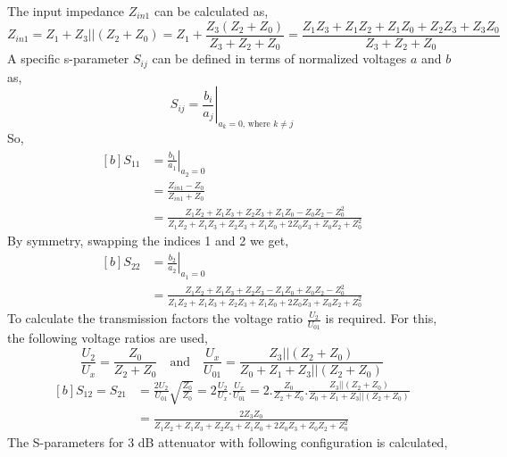 \documentclass{lab_sheet}
\newcommand\ddfrac[2]{{\displaystyle\frac{\displaystyle #1}{\displaystyle #2}}}
\begin{document}
The input impedance $Z_{in1}$ can be calculated as,
\begin{equation*}
        Z_{in1}=Z_1+Z_3||(Z_2+Z_0)=Z_1+\frac{Z_3(Z_2+Z_0)}{Z_3+Z_2+Z_0}=\frac{Z_1Z_3+Z_1Z_2+Z_1Z_0+Z_2Z_3+Z_3Z_0}{Z_3+Z_2+Z_0}
\end{equation*}
A specific s-parameter $S_{ij}$ can be defined in terms of normalized voltages $a$ and $b$ as,
\begin{equation*}
 S_{ij}= \left.\frac{b_i}{a_j}\right\vert_{a_k=0\text{, where } k\neq j}
\end{equation*}
So,
\begin{equation}
      \begin{aligned}[b]
        S_{11}&=\left.\frac{b_1}{a_1}\right\vert_{a_2=0}\\
        &=\frac{Z_{in1} - Z_0}{Z_{in1} + Z_0}\\
        &=\frac{Z_1Z_2+Z_1Z_3+Z_2Z_3+Z_1Z_0-Z_0Z_2-Z_0^2}{Z_1Z_2+Z_1Z_3+Z_2Z_3+Z_1Z_0+2Z_0Z_3+Z_0Z_2+Z_0^2}
      \end{aligned}
\end{equation}
\label{eqn:s11}
By symmetry, swapping the indices 1 and 2 we get,
\begin{equation}
    \begin{aligned}[b]
      S_{22}&=\left.\frac{b_2}{a_2}\right\vert_{a_1=0}\\
      &=\frac{Z_1Z_2+Z_1Z_3+Z_2Z_3-Z_1Z_0+Z_0Z_2-Z_0^2}{Z_1Z_2+Z_1Z_3+Z_2Z_3+Z_1Z_0+2Z_0Z_3+Z_0Z_2+Z_0^2}
    \end{aligned}
    \label{eqn:s22}
\end{equation}
To calculate the transmission factors the voltage ratio $\ddfrac{U_2}{U_{01}}$ is required. For this, the following voltage ratios are used,
\begin{equation*}
    \frac{U_2}{U_x}=\frac{Z_0}{Z_2+Z_0} \quad \text{and} \quad \frac{U_x}{U_{01}}=\frac{Z_3||(Z_2+Z_0)}{Z_0+Z_1+Z_3||(Z_2+Z_0)}
\end{equation*}
\begin{equation}
    \begin{aligned}[b]
        S_{12}=S_{21}&=\frac{2U_2}{U_{01}}\sqrt{\frac{Z_0}{Z_0}}=2\frac{U_2}{U_x}.\frac{U_x}{U_{01}}
        =2.\frac{Z_0}{Z_2+Z_0}.\frac{Z_3||(Z_2+Z_0)}{Z_0+Z_1+Z_3||(Z_2+Z_0)}\\
        &=\frac{2Z_3Z_0}{Z_1Z_2+Z_1Z_3+Z_2Z_3+Z_1Z_0+2Z_0Z_3+Z_0Z_2+Z_0^2}
    \end{aligned}
\end{equation}
The S-parameters for 3 dB attenuator with following configuration is calculated,
\end{document}
